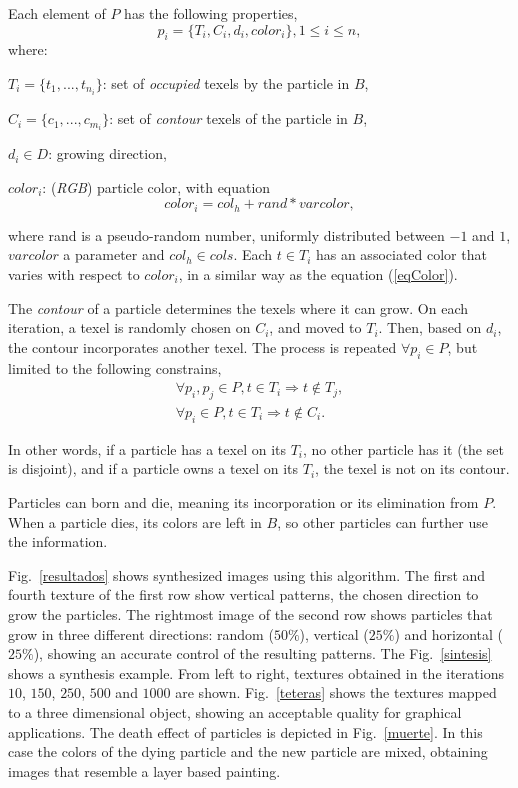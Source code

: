 Each element of $P$ has the following properties,
\begin{equation}
p_{i} = \{T_{i}, C_{i}, d_{i}, color_{i}\}, 1 \le i \le n,
\end{equation}
where:

$T_{i} = \{t_{1}, ... , t_{n_{i}}\}$: set of {\em occupied} texels by the particle in $B$,

$C_{i} = \{c_{1}, ... , c_{m_{i}}\}$: set of {\em contour} texels of the particle in $B$,

$d_{i} \in D$: growing direction,

$color_{i}$: ({\em RGB}) particle color, with equation \cite{Reeves1983}
\begin{equation}
color_{i} = col_{h} + rand * varcolor,
\label{eqColor}
\end{equation}

\noindent
where rand is a pseudo-random number, uniformly distributed between $-1$ and $1$, $varcolor$ a parameter and $col_{h} \in cols$.
Each $t \in T_{i}$ has an associated color that varies with respect to $color_{i}$, in a similar way as the equation (\ref{eqColor}).

The {\em contour} of a particle determines the texels where it can grow.
On each iteration, a texel is randomly chosen on $C_{i}$, and moved to $T_{i}$.
Then, based on $d_{i}$, the contour incorporates another texel.
The process is repeated $\forall p_{i} \in P$, but limited to the following constrains, 
\begin{eqnarray}
\forall p_{i}, p_{j} \in P, t \in T_{i} \Rightarrow t \notin T_{j}, \\
\forall p_{i} \in P, t \in T_{i} \Rightarrow t \notin C_{i}.
\end{eqnarray}

In other words, if a particle has a texel on its $T_{i}$, no other particle has it (the set is disjoint), and if a particle owns a texel on its $T_{i}$, the texel is not on its contour.

Particles can born and die, meaning its incorporation or its elimination from $P$.
When a particle dies, its colors are left in $B$, so other particles can further use the information.


Fig.~\ref{resultados} shows synthesized images using this algorithm.
The first and fourth texture of the first row show vertical patterns, the chosen direction to grow the particles.
The rightmost image of the second row shows particles that grow in three different directions: random ($50\%$), vertical ($25\%$) and horizontal ($25\%$), showing an accurate control of the resulting patterns.
The Fig.~\ref{sintesis} shows a synthesis example.
From left to right, textures obtained in the iterations $10$, $150$, $250$, $500$ and $1000$ are shown.
Fig.~\ref{teteras} shows the textures mapped to a three dimensional object, showing an acceptable quality for graphical applications.
The death effect of particles is depicted in Fig.~\ref{muerte}.
In this case the colors of the dying particle and the new particle are mixed, obtaining images that resemble a layer based painting.

